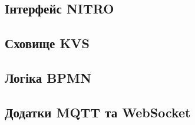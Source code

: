 \subsection{Інтерфейс NITRO}

\subsection{Сховище KVS}

\subsection{Логіка BPMN}

\subsection{Додатки MQTT та WebSocket}
